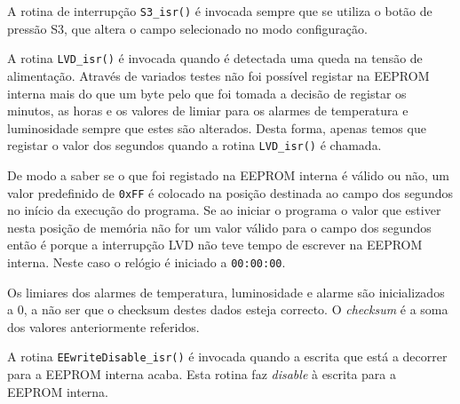 \documentclass[a4paper,12pt]{article}
\begin{document}
A rotina de interrupção \texttt{S3\_isr()} é invocada sempre que se utiliza o botão de pressão S3, que altera o campo selecionado no modo configuração.

A rotina \texttt{LVD\_isr()} é invocada quando é detectada uma queda na tensão de alimentação. Através de variados testes não foi possível registar na EEPROM interna mais do que um byte pelo que foi tomada a decisão de registar os minutos, as horas e os valores de limiar para os alarmes de temperatura e luminosidade sempre que estes são alterados. Desta forma, apenas temos que registar o valor dos segundos quando a rotina \texttt{LVD\_isr()} é chamada.

De modo a saber se o que foi registado na EEPROM interna é válido ou não, um valor predefinido de \texttt{0xFF} é colocado na posição destinada ao campo dos segundos no início da execução do programa. Se ao iniciar o programa o valor que estiver nesta posição de memória não for um valor válido para o campo dos segundos então é porque a interrupção LVD não teve tempo de escrever na EEPROM interna. Neste caso o relógio é iniciado a \texttt{00:00:00}.

Os limiares dos alarmes de temperatura, luminosidade e alarme são inicializados a 0, a não ser que o checksum destes dados esteja correcto. O \textit{checksum} é a soma dos valores anteriormente referidos.

A rotina \texttt{EEwriteDisable\_isr()} é invocada quando a escrita que está a decorrer para a EEPROM interna acaba. Esta rotina faz \textit{disable} à escrita para a EEPROM interna.
\end{document}
